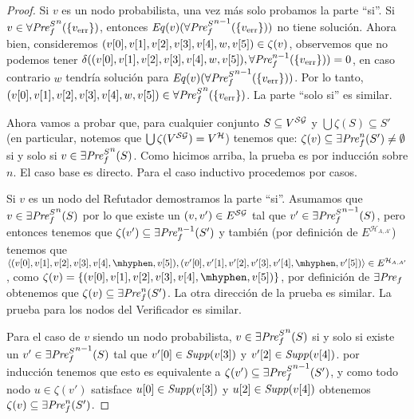 \begin{proof}
        Si $v$ es un nodo probabilista, una vez más solo probamos la parte ``si''.   Si $v \in  {\SymbAFairpre}^n(\{ \ErrorSt \})$, entonces
        $\Eq(v)({\SymbAFairpre}^{n-1}(\{ \ErrorSt \}))$ no tiene solución.  Ahora bien, consideremos 
        $(\pr{0}{v},  \pr{1}{v}, \pr{2}{v}, \pr{3}{v}, \pr{4}{v}, w,\pr{5}{v}) \in \zeta(v)$, observemos que no podemos tener 
        $\delta((\pr{0}{v},  \pr{1}{v}, \pr{2}{v}, \pr{3}{v}, \pr{4}{v}, w,\pr{5}{v}),  \AFairpre^{n-1}(\{ \ErrorSt \})) = 0$,  en caso contrario
        $w$ tendría solución para  $\Eq(v)({\SymbAFairpre}^{n-1}(\{ \ErrorSt \}))$. Por lo tanto,  
        $(\pr{0}{v},  \pr{1}{v}, \pr{2}{v}, \pr{3}{v}, \pr{4}{v}, w,\pr{5}{v}) \in  {\SymbAFairpre}^n(\{ \ErrorSt \})$. La parte ``solo si'' es similar.
        
       Ahora vamos a probar que, para cualquier conjunto $S \subseteq V^{\SymbG}$ y $ \bigcup \zeta(S) \subseteq S'$ (en particular, notemos que $\bigcup \zeta(V^{\SymbG}) = V^{\mathcal{H}}$)
        tenemos que: 
       $\zeta(v) \subseteq  \EFairpre^n( S' ) \neq \emptyset$ si y solo si $v \in {\SymbEFairpre}^n( S )$. Como hicimos arriba, la prueba es por inducción sobre $n$.
       El caso base es directo.  Para el caso inductivo procedemos por casos.
       
       Si $v$ es un nodo del Refutador demostramos la parte ``si''.  Asumamos que $v \in  {\SymbEFairpre}^n( S )$ por lo que existe un
       $(v, v') \in E^{\SymbG}$ tal que $v' \in {\SymbEFairpre}^{n-1}( S )$,  pero entonces tenemos que $\zeta(v') \subseteq \EFairpre^{n-1}( S' )$ y también (por definición de $E^{\mathcal{H}_{A,A'}}$) tenemos que 
       $\langle (\pr{0}{v},\pr{1}{v},\pr{2}{v},\pr{3}{v},\pr{4}{v},\mhyphen, \pr{5}{v}),(\pr{0}{v'},\pr{1}{v'},\pr{2}{v'},\pr{3}{v'},\pr{4}{v'},\mhyphen,\pr{5}{v'}) \rangle \in E^{\mathcal{H}_{A,A'}}$,
       como $\zeta(v) = \{(\pr{0}{v},\pr{1}{v},\pr{2}{v},\pr{3}{v},\pr{4}{v},\mhyphen, \pr{5}{v})\}$, por definición de $\EFairpre$ obtenemos que
       $\zeta(v) \subseteq  \EFairpre^n( S' )$. La otra dirección de la prueba es similar. La prueba para los nodos del Verificador es similar.
       
       Para el caso de $v$ siendo un nodo probabilista,   $v \in  {\SymbEFairpre}^n( S )$ si y solo si existe un
       $v' \in  {\SymbEFairpre}^{n-1}( S )$ tal que $\pr{0}{v'} \in \support{\pr{3}{v}}$ y $\pr{2}{v'} \in \support{\pr{4}{v}}$.
       por inducción tenemos que esto es equivalente a $\zeta(v') \subseteq  {\SymbEFairpre}^{n-1}( S' )$, y como todo nodo $u \in \zeta(v')$ satisface
       $\pr{0}{u} \in \support{\pr{3}{v}}$ y $\pr{2}{u} \in \support{\pr{4}{v}}$ obtenemos $\zeta(v) \subseteq \EFairpre^n( S' )$.
       

\end{proof}
